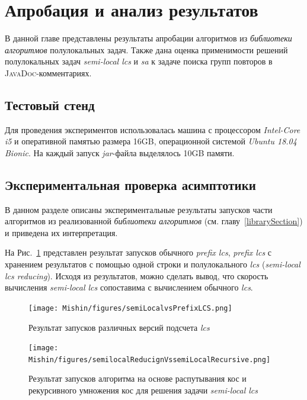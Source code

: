 \section{Апробация и анализ результатов}\label{appob}
В данной главе представлены результаты апробации алгоритмов из \emph{библиотеки алгоритмов} полулокальных задач.
Также дана оценка применимости решений полулокальных задач \emph{semi-local lcs} и \emph{sa} к задаче поиска групп повторов в \textsc{JavaDoc}-комментариях.


\subsection{Тестовый стенд}

Для проведения экспериментов использовалась машина с процессором \emph{Intel-Core i5} и оперативной памятью размера 16GB, операционной системой \emph{Ubuntu 18.04 Bionic}.
На каждый запуск \emph{jar}-файла выделялось 10GB памяти.

\subsection{Экспериментальная проверка асимптотики}

В данном разделе описаны экспериментальные результаты запусков части алгоритмов из реализованной \emph{библиотеки алгоритмов} (см. главу~\ref{librarySection}) и приведена их интерпретация.

На Рис.~\ref{fig:speedlcs} представлен результат запусков обычного \emph{prefix lcs}, \emph{prefix lcs} с хранением результатов с помощью одной строки и полулокального \emph{lcs} (\emph{semi-local lcs reducing}).
Исходя из результатов, можно сделать вывод, что скорость вычисления \emph{semi-local lcs} сопоставима с вычислением обычного \emph{lcs}.

\begin{figure}[t!]
\centering
    \texttt{[image: Mishin/figures/semiLocalvsPrefixLCS.png]}
    \caption{Результат запусков различных версий подсчета \emph{lcs} }\label{fig:speedlcs}
\end{figure}

\begin{figure}[t!]
\centering
    \texttt{[image: Mishin/figures/semilocalReducignVssemiLocalRecursive.png]}
    \caption{Результат запусков алгоритма на основе распутывания кос и рекурсивного умножения кос для решения задачи \emph{semi-local lcs} }\label{fig:speedlcs2}
\end{figure}

